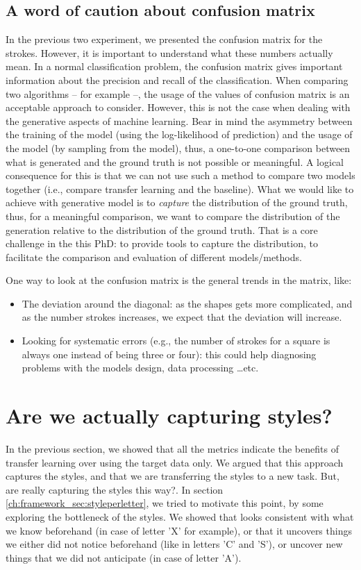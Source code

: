 \subsection{A word of caution about confusion matrix}
\par In the previous two experiment, we presented the confusion matrix for the strokes. However, it is important to understand what these numbers actually mean. In a normal classification problem, the confusion matrix gives important information about the precision and recall of the classification. When comparing two algorithms -- for example --, the usage of the values of confusion matrix is an acceptable approach to consider. However, this is not the case when dealing with the generative aspects of machine learning. Bear in mind the asymmetry between the training of the model (using the log-likelihood of prediction) and the usage of the model (by sampling from the model), thus, a one-to-one comparison between what is generated and the ground truth is not possible or meaningful. A logical consequence for this is that we can not use such a method to compare two models together (i.e., compare transfer learning and the baseline). What we would like to achieve with generative model is to \textit{capture} the distribution of the ground truth, thus, for a meaningful comparison, we want to compare the distribution of the generation relative to the distribution of the ground truth. That is a core challenge in the this PhD: to provide tools to capture the distribution, to facilitate the comparison and evaluation of different models/methods.

\par One way to look at the confusion matrix is the general trends in the matrix, like:
\begin{itemize}
  \item The deviation around the diagonal: as the shapes gets more complicated, and as the number strokes increases, we expect that the deviation will increase.
  \item Looking for systematic errors (e.g., the number of strokes for a square is always one instead of being three or four): this could help diagnosing problems with the models design, data processing \dots etc.
\end{itemize}

\section{Are we actually capturing styles?}
\par In the previous section, we showed that all the metrics indicate the benefits of transfer learning over using the target data only. We argued that this approach captures the styles, and that we are transferring the styles to a new task. But, are really capturing the styles this way?. In section \ref{ch:framework_sec:styleperletter}, we tried to motivate this point, by some exploring the bottleneck of the styles. We showed that looks consistent with what we know beforehand (in case of letter 'X' for example), or that it uncovers things we either did not notice beforehand (like in letters 'C' and 'S'), or uncover new things that we did not anticipate (in case of letter 'A').

